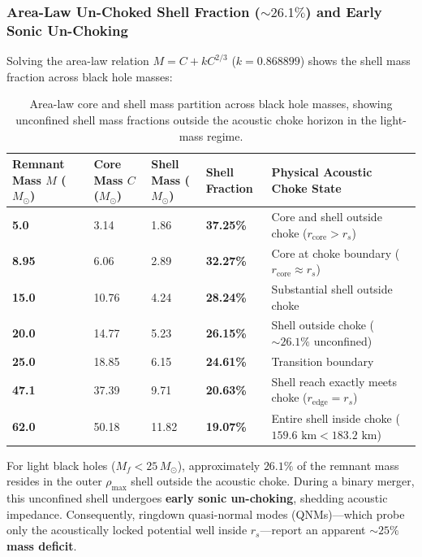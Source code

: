 \documentclass[11pt,a4paper]{article}
\begin{document}
\subsubsection{Area-Law Un-Choked Shell Fraction (\texorpdfstring{$\sim 26.1\%$}{26.1\%}) and Early Sonic Un-Choking}
\label{subsubsec:unchoking_fraction}

Solving the area-law relation $M = C + k C^{2/3}$ ($k = 0.868899$) shows the shell mass fraction across black hole masses:

\begin{table}[!htbp]
\centering
\caption{Area-law core and shell mass partition across black hole masses, showing unconfined shell mass fractions outside the acoustic choke horizon in the light-mass regime.}
\label{tab:area_law_partition}
\footnotesize
\setlength{\tabcolsep}{4pt}
\renewcommand{\arraystretch}{1.18}
\begin{tabularx}{\textwidth}{C{2.1cm} C{2.0cm} C{2.0cm} C{2.0cm} Y}
\toprule
\textbf{Remnant Mass $M$ ($M_\odot$)} & \textbf{Core Mass $C$ ($M_\odot$)} & \textbf{Shell Mass ($M_\odot$)} & \textbf{Shell Fraction} & \textbf{Physical Acoustic Choke State} \\
\midrule
\textbf{5.0} & 3.14 & 1.86 & \textbf{37.25\%} & Core and shell outside choke ($r_{\text{core}} > r_s$) \\
\textbf{8.95} & 6.06 & 2.89 & \textbf{32.27\%} & Core at choke boundary ($r_{\text{core}} \approx r_s$) \\
\textbf{15.0} & 10.76 & 4.24 & \textbf{28.24\%} & Substantial shell outside choke \\
\textbf{20.0} & 14.77 & 5.23 & \textbf{26.15\%} & Shell outside choke ($\sim 26.1\%$ unconfined) \\
\textbf{25.0} & 18.85 & 6.15 & \textbf{24.61\%} & Transition boundary \\
\textbf{47.1} & 37.39 & 9.71 & \textbf{20.63\%} & Shell reach exactly meets choke ($r_{\text{edge}} = r_s$) \\
\textbf{62.0} & 50.18 & 11.82 & \textbf{19.07\%} & Entire shell inside choke ($159.6\text{ km} < 183.2\text{ km}$) \\
\bottomrule
\end{tabularx}
\end{table}

For light black holes ($M_f < 25\,M_\odot$), approximately \textbf{$26.1\%$} of the remnant mass resides in the outer $\rho_{\max}$ shell outside the acoustic choke. During a binary merger, this unconfined shell undergoes \textbf{early sonic un-choking}, shedding acoustic impedance. Consequently, ringdown quasi-normal modes (QNMs)---which probe only the acoustically locked potential well inside $r_s$---report an apparent \textbf{$\sim 25\%$ mass deficit}.
\end{document}
